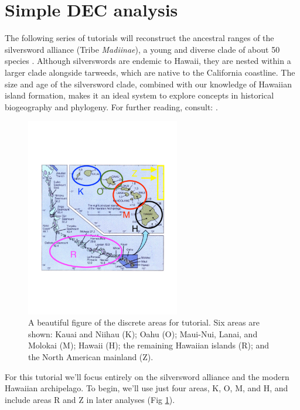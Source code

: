 

\section{Simple DEC analysis} \label{sec:bg_simple}


The following series of tutorials will reconstruct the ancestral ranges of the silversword alliance (Tribe {\it Madiinae}), a young and diverse clade of about 50 species \citep{carlquistXX}.
Although silverswords are endemic to Hawaii, they are nested within a larger clade alongside tarweeds, which are native to the California coastline.
The size and age of the silversword clade, combined with our knowledge of Hawaiian island formation, makes it an ideal system to explore concepts in historical biogeography and phylogeny.
For further reading, consult: \citet{baldwin,XX,XX,XX}.
 
\begin{figure}[!ht]
\centering
\includegraphics[width=0.6\textwidth]{figures/fig_hawaii_areas.pdf}
\caption{A beautiful figure of the discrete areas for tutorial. Six areas are shown: Kauai and Niihau (K); Oahu (O); Maui-Nui, Lanai, and Molokai (M); Hawaii (H); the remaining Hawaiian islands (R); and the North American mainland (Z).}
\label{fig:hawaii_areas}
\end{figure}
 
For this tutorial we'll focus entirely on the silversword alliance and the modern Hawaiian archipelago.
To begin, we'll use just four areas, K, O, M, and H, and include areas R and Z in later analyses (Fig \ref{fig:hawaii_areas}).

